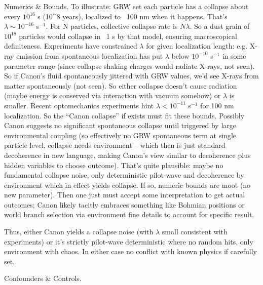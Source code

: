 \documentclass[11pt]{article}
\begin{document}
Numerics & Bounds. To illustrate: GRW set each particle has a collapse about every $10^{16}$ s (10^8 years), localized to ~100 nm when it happens. That’s $\lambda \sim 10^{-16}$ s$^{-1}$. For N particles, collective collapse rate is $N\lambda$. So a dust grain of $10^{18}$ particles would collapse in ~1 s by that model, ensuring macroscopical definiteness. Experiments have constrained $\lambda$ for given localization length: e.g. X-ray emission from spontaneous localization has put $\lambda$ below $10^{-10}$ s$^{-1}$ in some parameter range (since collapse shaking charges would radiate X-rays, not seen). So if Canon’s fluid spontaneously jittered with GRW values, we’d see X-rays from matter spontaneously (not seen). So either collapse doesn’t cause radiation (maybe energy is conserved via interaction with vacuum somehow) or $\lambda$ is smaller. Recent optomechanics experiments hint $\lambda < 10^{-11}$ s$^{-1}$ for 100 nm localization. So the “Canon collapse” if exists must fit these bounds. Possibly Canon suggests no significant spontaneous collapse until triggered by large environmental coupling (so effectively no GRW spontaneous term at single particle level, collapse needs environment – which then is just standard decoherence in new language, making Canon’s view similar to decoherence plus hidden variables to choose outcome). That’s quite plausible: maybe no fundamental collapse noise, only deterministic pilot-wave and decoherence by environment which in effect yields collapse. If so, numeric bounds are moot (no new parameter). Then one just must accept some interpretation to get actual outcomes; Canon likely tacitly embraces something like Bohmian positions or world branch selection via environment fine details to account for specific result.

Thus, either Canon yields a collapse noise (with $\lambda$ small consistent with experiments) or it’s strictly pilot-wave deterministic where no random hits, only environment with chaos. In either case no conflict with known physics if carefully set.


Confounders & Controls.
\end{document}
